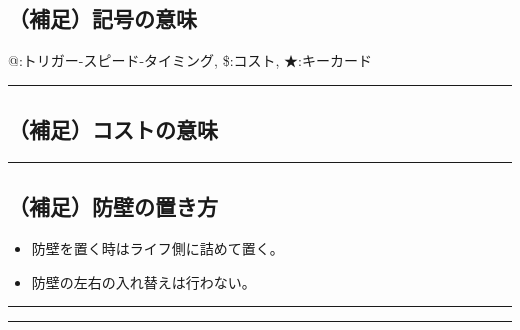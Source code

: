 \documentclass[twocolumn,a5paper,papersize,10pt]{jarticle}
\begin{document}
\subsection*{（補足）記号の意味}
\vspace{-1zh}%
{\scriptsize @:トリガー-スピード-タイミング, 
\$:コスト, 
★:キーカード}

\vspace{1mm}%
\hrule height 0.1mm depth 0mm width 66.5mm %
\vspace{-3zh}%

\subsection*{（補足）コストの意味}
\vspace{-1zh}%

\vspace{-3zh}%
\hrule height 0.1mm depth 0mm width 66.5mm %
\vspace{-3zh}%

\subsection*{（補足）防壁の置き方}
\vspace{-1zh}%
\begin{itemize}
\setlength{\leftskip}{-0.3cm}%
\setlength{\parskip}{0pt}      %

\item 防壁を置く時はライフ側に詰めて置く。
\item 防壁の左右の入れ替えは行わない。
\end{itemize}

\begin{center}
\begin{center}
\hrule height 1mm depth 0mm width 66.5mm %
\vspace{1mm}%
{\Large\bf {}}
\vspace{1mm}%
\hrule height 0.5mm depth 0mm width 66.5mm %
\end{center}
\end{center}
\vspace{-1zh}%
\end{document}
